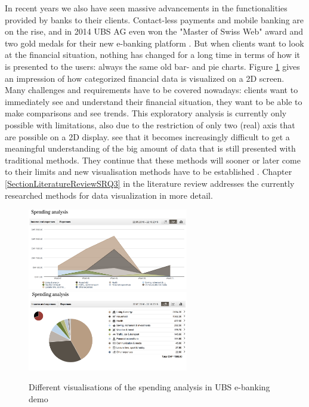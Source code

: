 In recent years we also have seen massive advancements in the functionalities provided by banks to their clients. Contact-less payments and mobile banking are on the rise, and in 2014 UBS AG even won the "Master of Swiss Web" award and two gold medals for their new e-banking platform \citep{UBSAG2014}. But when clients want to look at the financial situation, nothing has changed for a long time in terms of how it is presented to the users: always the same old bar- and pie charts. Figure \ref{fig:ubsspendinganalysis} gives an impression of how categorized financial data is visualized on a 2D screen. Many challenges and requirements have to be covered nowadays: clients want to immediately see and understand their financial situation, they want to be able to make comparisons and see trends. This exploratory analysis is currently only possible with limitations, also due to the restriction of only two (real) axis that are possible on a 2D display. \cite{Jamieson2007} see that it becomes increasingly difficult to get a meaningful understanding of the big amount of data that is still presented with traditional methods. They continue that these methods will sooner or later come to their limits and new visualisation methods have to be established \citep{Jamieson2007}. Chapter \ref{SectionLiteratureReviewSRQ3} in the literature review addresses the currently researched methods for data visualization in more detail.
\begin{figure}[b]
	\begin{center}
		\includegraphics[width=7cm]{03_Figures/06_Introduction/UBSAG2016_SpendingAnalysis2.png}
		\includegraphics[width=7cm]{03_Figures/06_Introduction/UBSAG2016_SpendingAnalysis.png}
		\caption[Different visualisations of the spending analysis in UBS e-banking demo]{Different visualisations of the spending analysis in UBS e-banking demo \citep{UBSAG2016}}
		\label{fig:ubsspendinganalysis}
	\end{center}
\end{figure}

